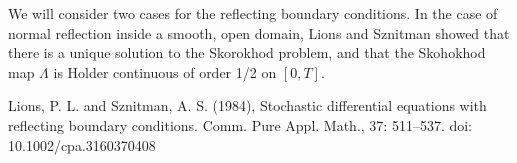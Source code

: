 \documentclass[]{article}
\theoremstyle{definition}
\theoremstyle{assumption}
\theoremstyle{remark}
\begin{document}
We will consider two cases for the reflecting boundary conditions. In the case of normal reflection inside a smooth, open domain, Lions and Sznitman \cite{Lions} showed that there is a unique solution to the Skorokhod problem, and that the Skohokhod map $\Lambda$ is Holder continuous of order 1/2 on $[0, T]$.

\begin{thebibliography}{9}

Lions, P. L. and Sznitman, A. S. (1984), Stochastic differential equations with reflecting boundary conditions. Comm. Pure Appl. Math., 37: 511–537. doi: 10.1002/cpa.3160370408

\end{thebibliography}
\end{document}
